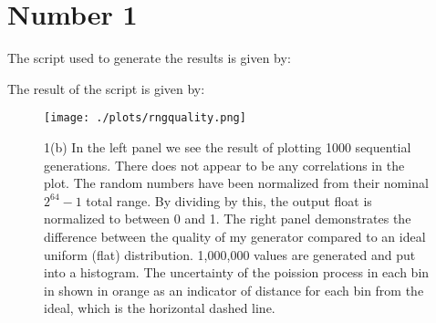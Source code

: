\section{Number 1}

The script used to generate the results is given by:



The result of the script is given by:




\begin{figure}[h!]
  \centering
  \texttt{[image: ./plots/rngquality.png]}
  \caption{1(b) In the left panel we see the result of plotting 1000 sequential generations. There does not appear to be any correlations in the plot. The random numbers have been normalized from their nominal $2^{64}-1$ total range. By dividing by this, the output float is normalized to between 0 and 1. The right panel demonstrates the difference between the quality of my generator compared to an ideal uniform (flat) distribution. 1,000,000 values are generated and put into a histogram. The uncertainty of the poission process in each bin in shown in orange as an indicator of distance for each bin from the ideal, which is the horizontal dashed line.}
  \label{fig:rngquality}
\end{figure}
